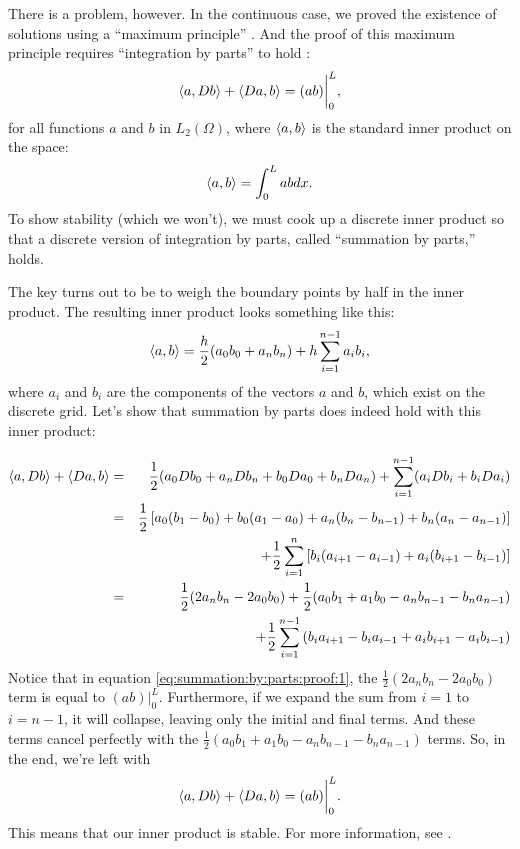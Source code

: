 \documentclass[]{article}
\newcommand{\eval}{\biggr\rvert} %
\begin{document}
There is a problem, however. In the continuous case, we proved the existence of solutions using a ``maximum principle'' \cite{wikimaxprinciple,BC}. And the proof of this maximum principle requires ``integration by parts'' to hold \cite{BC}:
\begin{equation}
  \label{eq:integration:by:parts}
  \braket{a,Db} + \braket{Da,b} = (ab)\eval_0^L,
\end{equation}
for all functions $a$ and $b$ in $L_2(\Omega)$, where $\braket{a,b}$
is the standard inner product on the space:
\begin{equation}
  \label{eq:inner:product}
  \braket{a,b} = \int_0^L ab dx.
\end{equation}
To show stability (which we won't), we must cook up a discrete inner
product so that a discrete version of integration by parts, called ``summation by parts,'' holds.

The key turns out to be to weigh the boundary points by half in the
inner product. The resulting inner product looks something like this:
\begin{equation}
  \label{eq:discrete:inner:product}
  \braket{a,b} = \frac{h}{2} (a_0 b_0 + a_n b_n) + h\sum_{i=1}^{n-1}a_i b_i,
\end{equation}
where $a_i$ and $b_i$ are the components of the vectors $a$ and $b$,
which exist on the discrete grid. Let's show that summation by parts does indeed hold with this inner product:

\begin{eqnarray}
  \label{eq:summation:by:parts:proof:1}
  \braket{a,Db} + \braket{Da,b} &=& \frac{1}{2}(a_0 Db_0 + a_n Db_n + b_0 Da_0 + b_n D a_n) + \sum_{i=1}^{n-1}(a_i Db_i + b_i Da_i)\nonumber\\
  &=& \frac{1}{2}\left[a_0(b_1-b_0) + b_0(a_1-a_0) + a_n(b_n-b_{n-1})+b_n(a_n-a_{n-1})\right]\nonumber\\
  &&\qquad + \frac{1}{2}\sum_{i=1}^n \left[b_i (a_{i+1}-a_{i-1}) + a_i(b_{i+1}-b_{i-1})\right]\nonumber\\
  &=& \frac{1}{2}(2 a_n b_n - 2 a_0 b_0) + \frac{1}{2}(a_0 b_1 + a_1b_0 - a_n b_{n-1} - b_n a_{n-1})\nonumber\\
  &&\qquad + \frac{1}{2} \sum_{i=1}^{n-1}\left(b_i a_{i+1} - b_i a_{i-1} + a_i b_{i+1} - a_i b_{i-1}\right)
\end{eqnarray}
Notice that in equation \eqref{eq:summation:by:parts:proof:1}, the
$\frac{1}{2}(2 a_n b_n - 2 a_0 b_0)$ term is equal to $(ab)\eval_0^L.$
Furthermore, if we expand the sum from $i=1$ to $i=n-1$, it will
collapse, leaving only the initial and final terms. And these terms
cancel perfectly with the $\frac{1}{2}(a_0 b_1 + a_1b_0 - a_n b_{n-1}
- b_n a_{n-1})$ terms. So, in the end, we're left with
\begin{equation}
  \label{eq:summation:by:parts:proof:2}
  \braket{a,Db}+\braket{Da,b} = (ab)\eval_0^L.
\end{equation}
This means that our inner product is stable. For more information, see \cite{Diener,Olsson1,Olsson1Sup,Olsson2}.
\end{document}
